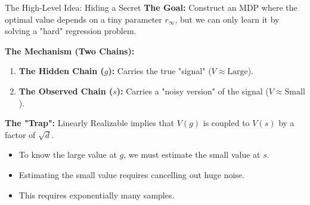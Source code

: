 \documentclass[aspectratio=169]{beamer}
\begin{document}
\begin{frame}{The High-Level Idea: Hiding a Secret}
    \textbf{The Goal:} Construct an MDP where the optimal value depends on a tiny parameter $r_\infty$, but we can only learn it by solving a "hard" regression problem.
    
    \vspace{0.3cm}
    \textbf{The Mechanism (Two Chains):}
    \begin{enumerate}
        \item \textbf{The Hidden Chain ($g$):} 
        Carries the true "signal" ($V \approx \text{Large}$).
        \item \textbf{The Observed Chain ($s$):} 
        Carries a "noisy version" of the signal ($V \approx \text{Small}$).
    \end{enumerate}
    
    \vspace{0.3cm}
    \textbf{The "Trap":}
    Linearly Realizable implies that $V(g)$ is coupled to $V(s)$ by a factor of $\sqrt{d}$.
    \begin{itemize}
        \item To know the large value at $g$, we must estimate the small value at $s$.
        \item Estimating the small value requires cancelling out huge noise.
        \item This requires exponentially many samples.
    \end{itemize}
\end{frame}
\end{document}
